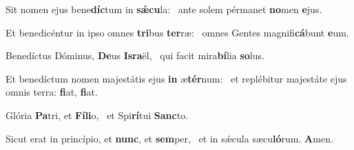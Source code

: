 \item Sit nomen ejus bene\textbf{díc}tum in \textbf{sǽ}\textbf{cu}la:~\psstar{} ante solem pérmanet \textbf{no}men \textbf{e}jus.
\item Et benedicéntur in ipso omnes \textbf{tri}bus \textbf{ter}ræ:~\psstar{} omnes Gentes magnifi\textbf{cá}bunt \textbf{e}um.
\item Benedíctus Dóminus, \textbf{De}us \textbf{Is}\textbf{ra}ël,~\psstar{} qui facit mira\textbf{bí}lia \textbf{so}lus.
\item Et benedíctum nomen majestátis ejus \textbf{in} æ\textbf{tér}num:~\psstar{} et replébitur majestáte ejus omnis terra: \textbf{fi}at, \textbf{fi}at.
\item Glória \textbf{Pa}tri, et \textbf{Fí}\textbf{li}o,~\psstar{} et Spi\textbf{rí}tui \textbf{Sanc}to.
\item Sicut erat in princípio, et \textbf{nunc}, et \textbf{sem}per,~\psstar{} et in sǽcula sæcu\textbf{ló}rum. \textbf{A}men.
